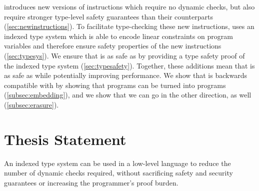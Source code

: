 \name introduces new versions of \wasm instructions which require no dynamic checks, but also require stronger type-level safety guarantees than their \wasm counterparts (\autoref{sec:newinstructions}).
To facilitate type-checking these new instructions, \name uses an indexed type system which is able to encode linear constraints on program variables and therefore ensure safety properties of the new \name instructions (\autoref{sec:typesys}).
We ensure that \name is as safe as \wasm by providing a type safety proof of the \name indexed type system (\autoref{sec:typesafety}).
Together, these additions mean that \name is as safe as \wasm while potentially improving performance.
We show that \name is backwards compatible with \wasm by showing that \wasm programs can be turned into \name programs (\autoref{subsec:embedding}), and we show that we can go in the other direction, as well (\autoref{subsec:erasure}).

\section{Thesis Statement}
\begin{adjustwidth}{1cm}{1cm}
    An indexed type system can be used in a low-level language to reduce the number of dynamic checks required, without sacrificing safety and security guarantees or increasing the programmer's proof burden.
\end{adjustwidth}
